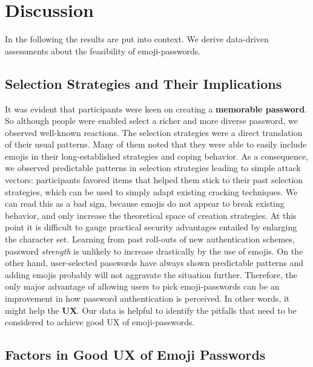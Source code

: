 \section{Discussion}
In the following the results are put into context. We derive data-driven assessments about the feasibility of emoji-passwords. 
\subsection{Selection Strategies and Their Implications}
It was evident that participants were keen on creating a \textbf{memorable password}. So although people were enabled select a richer and more diverse password, we observed well-known reactions. 
The selection strategies were a direct translation of their usual patterns. Many of them noted that they were able to easily include emojis in their long-established strategies and coping behavior. As a consequence, we observed predictable patterns in selection strategies leading to simple attack vectors: participants favored items that helped them stick to their past selection strategies, which can be used to simply adapt existing cracking techniques.
We can read this as a bad sign, because emojis do not appear to break existing behavior, and only increase the theoretical space of creation strategies. At this point it is difficult to gauge practical security advantages entailed by enlarging the character set. Learning from past roll-outs of new authentication schemes, password \textit{strength} is unlikely to increase drastically by the use of emojis. 
On the other hand, user-selected passwords have always shown predictable patterns and adding emojis probably will not aggravate the situation further. Therefore, the only major advantage of allowing users to pick emoji-passwords can be an improvement in how password authentication is perceived. In other words, it might help the \textbf{\gls{UX}}. Our data is helpful to identify the pitfalls that need to be considered to achieve good UX of emoji-passwords. 

\subsection{Factors in Good UX of Emoji Passwords}
